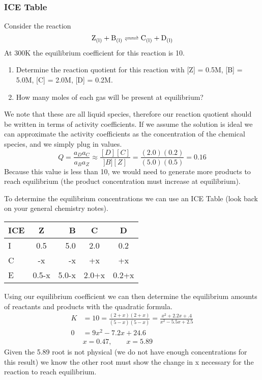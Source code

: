 \documentclass{article}
\begin{document}
\subsubsection*{ICE Table}
Consider the reaction
\begin{equation}
\ce{Z_{(l)} + B_{(l)} <=> C_{(l)} + D_{(l)} }
\end{equation}
At 300K the equilibrium coefficient for this reaction is 10. 
\begin{enumerate}
    \item Determine the reaction quotient for this reaction with [Z] = 0.5M, [B] = 5.0M, [C] = 2.0M, [D] = 0.2M.
    \item How many moles of each gas will be present at equilibrium?
\end{enumerate}
We note that these are all liquid species, therefore our reaction quotient should be written in terms of activity coefficients.
If we assume the solution is ideal we can approximate the activity coefficients as the concentration of the chemical species, and we simply plug in values. 
\begin{equation}
Q = \frac{a_Da_C}{a_Ba_Z} \approx \frac{[D][C]}{]B][Z]} = \frac{(2.0) (0.2)}{(5.0)(0.5)} = 0.16
\end{equation}
Because this value is less than 10, we would need to generate more products to reach equilibrium (the product concentration must increase at equilibrium). 

To determine the equilibrium concentrations we can use an ICE Table (look back on your general chemistry notes). 
\begin{center}
  \begin{tabular}{ | l | c | r | c | c | }
    \hline
    ICE & Z & B & C & D \\ \hline
    I & 0.5 & 5.0 & 2.0 & 0.2 \\ \hline
    C & -x & -x & +x & +x \\ \hline
    E & 0.5-x & 5.0-x & 2.0+x & 0.2+x \\ \hline
  \end{tabular}
\end{center}
Using our equilibrium coefficient we can then determine the equilibrium amounts of reactants and products with the quadratic formula. 
\begin{equation}
\begin{split}
    K &= 10 = \frac{(2+x)(2+x)}{(5-x)(5-x)} = \frac{x^2+2.2x+.4}{x^2 - 5.5x +2.5} \\
    0 &= 9x^2 - 7.2x + 24.6 \\ 
    & x = 0.47, \qquad x = 5.89
\end{split}
\end{equation}
Given the 5.89 root is not physical (we do not have enough concentrations for this result) we know the other root must show the change in x necessary for the reaction to reach equilibrium. 
\end{document}

